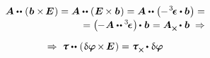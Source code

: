 \begin{otherlanguage}{russian}
\nopagebreak\vspace{-0.5em}\begin{multline*}
\bm{A} \dotdotp \hspace{-0.25ex} \left( \hspace{.1ex} \bm{b} \times \hspace{-0.2ex} \bm{E} \hspace{.1ex} \right)
= \bm{A} \dotdotp \hspace{-0.32ex} \left( \hspace{.1ex} \bm{E} \hspace{-0.12ex} \times \bm{b} \hspace{.1ex} \right)
= \bm{A} \dotdotp \hspace{-0.32ex} \left( \hspace{-0.1ex} - \hspace{.2ex} \levicivitatensor \dotp \bm{b} \hspace{.1ex} \right) =
\\[-0.2em]
%
\hspace*{\fill} = \left( \hspace{-0.1ex} - \hspace{.1ex} \bm{A} \dotdotp \levicivitatensor \hspace{.1ex} \right) \hspace{-0.2ex} \dotp \hspace{.1ex} \bm{b}
\hspace{.12ex} = \bm{A}_{\Xcompanion} \hspace{-0.1ex} \dotp \hspace{.1ex} \bm{b}
\hspace{.64ex} \Rightarrow
\end{multline*}

\nopagebreak\vspace{-0.5em}\begin{equation*}
\Rightarrow \hspace{.64ex}
\forcestresstensor \dotdotp \hspace{-0.25ex} \left( \hspace{.12ex} \variation{\fieldofrotations} \hspace{-0.2ex} \times \hspace{-0.2ex} \bm{E} \hspace{.12ex} \right)
= \forcestresstensor_{\Xcompanion} \hspace{-0.1ex} \dotp \hspace{.1ex} \variation{\fieldofrotations}
\end{equation*}


\end{otherlanguage}
